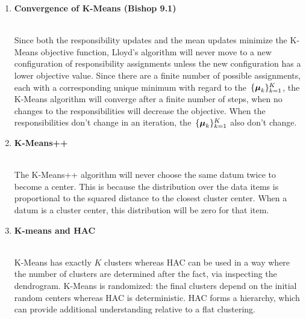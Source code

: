 \documentclass[12pt,letterpaper]{article}
\begin{document}
\begin{enumerate}
\item {\bf Convergence of K-Means (Bishop 9.1)}\\
 \\

\begin{solution}
Since both the responsibility updates and the mean updates minimize the K-Means objective function, Lloyd's algorithm will never move to a new configuration of responsibility assignments unless the new configuration has a lower objective value.  Since there are a finite number of possible assignments, each with a corresponding unique minimum with regard to the~$\{\boldsymbol{\mu}_k\}^K_{k=1}$, the K-Means algorithm will converge after a finite number of steps, when no changes to the responsibilities will decrease the objective.  When the responsibilities don't change in an iteration, the~$\{\boldsymbol{\mu}_k\}^K_{k=1}$ also don't change.
\end{solution}

\item {\bf K-Means++ }\\
 \\

\begin{solution}
The K-Means++ algorithm will never choose the same datum twice to become a center.  This is because the distribution over the data items is proportional to the squared distance to the closest cluster center.  When a datum is a cluster center, this distribution will be zero for that item.
\\
\end{solution}
\fi

\item{\bf K-means and HAC} \\
 \\
\begin{solution}
K-Means has exactly $K$ clusters whereas HAC can be used in a way where
the number of clusters are determined after the fact, via inspecting the
dendrogram. 
%
K-Means is randomized: the final clusters depend on the initial random centers
whereas HAC is deterministic.
%
HAC forms a hierarchy, which can provide additional understanding
relative to a flat clustering.
\end{solution}
\newpage


\end{enumerate}
\end{document}
